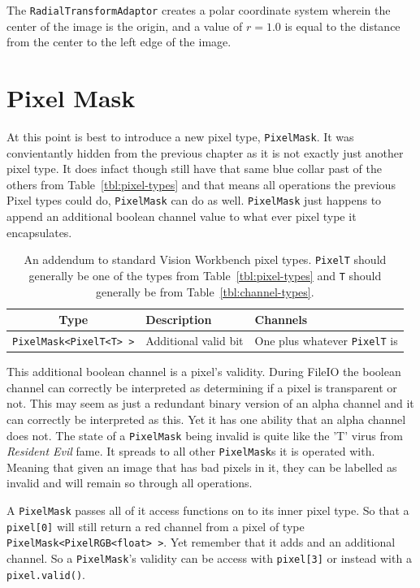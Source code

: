 The \verb#RadialTransformAdaptor# creates a polar coordinate system
wherein the center of the image is the origin, and a value of $r=1.0$ is
equal to the distance from the center to the left edge of the image.

\section{Pixel Mask}

At this point is best to introduce a new pixel type,
\verb#PixelMask#. It was convientantly hidden from the previous
chapter as it is not exactly just another pixel type. It does infact
though still have that same blue collar past of the others from
Table~\ref{tbl:pixel-types} and that means all operations the previous
Pixel types could do, \verb#PixelMask# can do as
well. \verb#PixelMask# just happens to append an additional boolean
channel value to what ever pixel type it encapsulates.

\begin{table}[h]\begin{centering}
\begin{tabular}{|c|l|l|} \hline
Type & Description & Channels \\ \hline \hline
\verb#PixelMask<PixelT<T> ># & Additional valid bit & One plus whatever \verb#PixelT# is \\ \hline
\end{tabular}
\caption{An addendum to standard Vision Workbench pixel types. {\tt PixelT} should generally be one of the types from Table~\ref{tbl:pixel-types} and {\tt T} should generally be from Table~\ref{tbl:channel-types}.}
\label{tbl:pixel-mask}
\end{centering}
\end{table}

This additional boolean channel is a pixel's validity. During FileIO
the boolean channel can correctly be interpreted as determining if a
pixel is transparent or not. This may seem as just a redundant binary
version of an alpha channel and it can correctly be interpreted as
this. Yet it has one ability that an alpha channel does not. The state
of a \verb#PixelMask# being invalid is quite like the 'T' virus from
\emph{Resident Evil} fame. It spreads to all other \verb#PixelMask#s
it is operated with. Meaning that given an image that has bad
pixels in it, they can be labelled as invalid and will remain so
through all operations.

A \verb#PixelMask# passes all of it access functions on to its inner
pixel type. So that a \verb#pixel[0]# will still return a red channel
from a pixel of type \verb#PixelMask<PixelRGB<float> >#. Yet remember
that it adds and an additional channel. So a \verb#PixelMask#'s
validity can be access with \verb#pixel[3]# or instead with a
\verb#pixel.valid()#.

